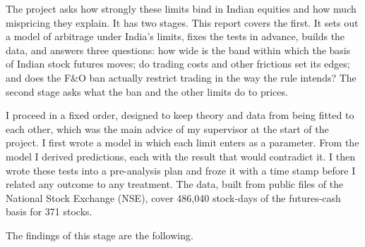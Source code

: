 The project asks how strongly these limits bind in Indian equities and how much mispricing they explain. It has two
stages. This report covers the first. It sets out a model of arbitrage under India's limits, fixes the tests in advance,
builds the data, and answers three questions: how wide is the band within which the basis of Indian stock futures
moves; do trading costs and other frictions set its edges; and does the F\&O ban actually restrict trading in the way the
rule intends? The second stage asks what the ban and the other limits do to prices.

I proceed in a fixed order, designed to keep theory and data from being fitted to each other, which was the main advice
of my supervisor at the start of the project. I first wrote a model in which each limit enters as a parameter. From the
model I derived predictions, each with the result that would contradict it. I then wrote these tests into a
pre-analysis plan and froze it with a time stamp before I related any outcome to any treatment. The data, built from
public files of the National Stock Exchange (NSE), cover 486,040 stock-days of the futures-cash basis for 371 stocks.

The findings of this stage are the following.

